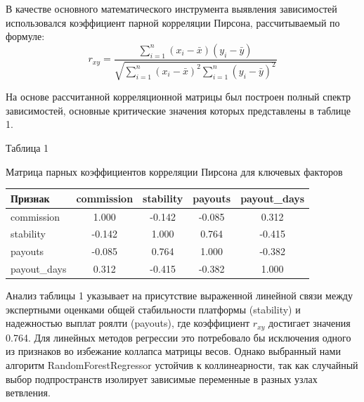 \documentclass[14pt, a4paper]{extarticle}
\begin{document}
В качестве основного математического инструмента выявления зависимостей использовался коэффициент парной корреляции Пирсона, рассчитываемый по формуле:
\begin{equation}
r_{xy} = \frac{\sum_{i=1}^n (x_i - \bar{x})(y_i - \bar{y})}{\sqrt{\sum_{i=1}^n (x_i - \bar{x})^2 \sum_{i=1}^n (y_i - \bar{y})^2}}
\end{equation}

На основе рассчитанной корреляционной матрицы был построен полный спектр зависимостей, основные критические значения которых представлены в таблице 1.

\begin{flushright}
Таблица 1
\end{flushright}
\begin{center}
Матрица парных коэффициентов корреляции Пирсона для ключевых факторов
\end{center}
\begin{tabular}{|l|c|c|c|c|}
\hline
Признак & commission & stability & payouts & payout\_days \\
\hline
commission & 1.000 & -0.142 & -0.085 & 0.312 \\
stability & -0.142 & 1.000 & 0.764 & -0.415 \\
payouts & -0.085 & 0.764 & 1.000 & -0.382 \\
payout\_days & 0.312 & -0.415 & -0.382 & 1.000 \\
\hline
\end{tabular}
\vspace{1em}

Анализ таблицы 1 указывает на присутствие выраженной линейной связи между экспертными оценками общей стабильности платформы (stability) и надежностью выплат роялти (payouts), где коэффициент $r_{xy}$ достигает значения 0.764. Для линейных методов регрессии это потребовало бы исключения одного из признаков во избежание коллапса матрицы весов. Однако выбранный нами алгоритм RandomForestRegressor устойчив к коллинеарности, так как случайный выбор подпространств изолирует зависимые переменные в разных узлах ветвления.
\end{document}
